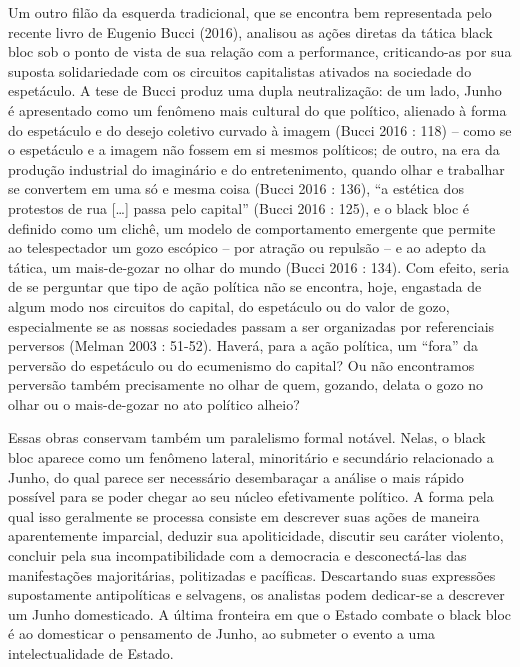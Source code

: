 Um outro filão da esquerda tradicional, que se encontra bem representada
pelo recente livro de Eugenio Bucci (2016), analisou as ações diretas da
tática black bloc sob o ponto de vista de sua relação com a performance,
criticando-as por sua suposta solidariedade com os circuitos
capitalistas ativados na sociedade do espetáculo. A tese de Bucci produz
uma dupla neutralização: de um lado, Junho é apresentado como um
fenômeno mais cultural do que político, alienado à forma do espetáculo e
do desejo coletivo curvado à imagem (Bucci 2016 : 118) -- como se o
espetáculo e a imagem não fossem em si mesmos políticos; de outro, na
era da produção industrial do imaginário e do entretenimento, quando
olhar e trabalhar se convertem em uma só e mesma coisa (Bucci 2016 :
136), ``a estética dos protestos de rua {[}\ldots{}{]} passa pelo
capital'' (Bucci 2016 : 125), e o black bloc é definido como um clichê,
um modelo de comportamento emergente que permite ao telespectador um
gozo escópico -- por atração ou repulsão -- e ao adepto da tática, um
mais-de-gozar no olhar do mundo (Bucci 2016 : 134). Com efeito, seria de
se perguntar que tipo de ação política não se encontra, hoje, engastada
de algum modo nos circuitos do capital, do espetáculo ou do valor de
gozo, especialmente se as nossas sociedades passam a ser organizadas por
referenciais perversos (Melman 2003 : 51-52). Haverá, para a ação
política, um ``fora'' da perversão do espetáculo ou do ecumenismo do
capital? Ou não encontramos perversão também precisamente no olhar de
quem, gozando, delata o gozo no olhar ou o mais-de-gozar no ato político
alheio?

Essas obras conservam também um paralelismo formal notável. Nelas, o
black bloc aparece como um fenômeno lateral, minoritário e secundário
relacionado a Junho, do qual parece ser necessário desembaraçar a
análise o mais rápido possível para se poder chegar ao seu núcleo
efetivamente político. A forma pela qual isso geralmente se processa
consiste em descrever suas ações de maneira aparentemente imparcial,
deduzir sua apoliticidade, discutir seu caráter violento, concluir pela
sua incompatibilidade com a democracia e desconectá-las das
manifestações majoritárias, politizadas e pacíficas. Descartando suas
expressões supostamente antipolíticas e selvagens, os analistas podem
dedicar-se a descrever um Junho domesticado. A última fronteira em que o
Estado combate o black bloc é ao domesticar o pensamento de Junho, ao
submeter o evento a uma intelectualidade de Estado.

